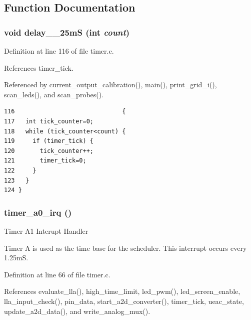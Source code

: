 \subsection{Function Documentation}
\subsubsection{\setlength{\rightskip}{0pt plus 5cm}void delay\_\_\-25m\-S (int {\em count})}\label{timer_8c_a1}




Definition at line 116 of file timer.c.

References timer\_\-tick.

Referenced by current\_\-output\_\-calibration(), main(), print\_\-grid\_\-i(), scan\_\-leds(), and scan\_\-probes().

\footnotesize\begin{verbatim}116                              {
117   int tick_counter=0;
118   while (tick_counter<count) {
119     if (timer_tick) {
120       tick_counter++;
121       timer_tick=0;
122     }
123   }
124 }
\end{verbatim}\normalsize 


\subsubsection{\setlength{\rightskip}{0pt plus 5cm}timer\_\-a0\_\-irq ()}\label{timer_8c_a0}


Timer A1 Interupt Handler

Timer A is used as the time base for the scheduler. This interrupt occurs every 1.25m\-S.

Definition at line 66 of file timer.c.

References evaluate\_\-lla(), high\_\-time\_\-limit, led\_\-pwm(), led\_\-screen\_\-enable, lla\_\-input\_\-check(), pin\_\-data, start\_\-a2d\_\-converter(), timer\_\-tick, ueac\_\-state, update\_\-a2d\_\-data(), and write\_\-analog\_\-mux().

